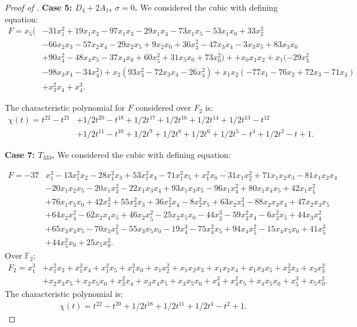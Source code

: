 \documentclass[12pt]{amsart}
\numberwithin{equation}{section}
\theoremstyle{plain}
\theoremstyle{remark}
\theoremstyle{definition}
\newcommand{\bF}{\mathbb{F}}
\begin{document}
\begin{proof}[Proof of ]
\noindent\textbf{Case 5: $D_4+2A_1$, $\sigma=0$.} We considered the cubic with defining equation:
\begin{equation}\label{ex: D4+2A1 no defect}
\begin{split}
    F= x_5(&-31x_1^2+ 19x_1x_2- 97x_1x_3- 29x_1x_4 - 73x_1x_5 - 53x_1x_0 + 33x_2^2\\
    &- 66x_2x_3- 57x_2x_4 - 29x_2x_5 + 9x_2x_0+ 36x_3^2 - 47x_3x_4 - 3x_3x_5 + 83x_3x_0\\
    &+ 90x_4^2 - 48x_4x_5 - 37x_4x_0 + 60x_5^2 + 31x_5x_0 + 73x_0^2)+ + x_0x_1x_2+x_1(- 29x_3^2 \\
    &- 98x_3x_4  - 34x_4^2)+x_2(93x_3^2 - 72x_3x_4  - 26x_4^2)+x_1x_2(-77x_1  - 76x_2+ 72x_3 - 71x_4)\\
    &+ x_3^2x_4  + x_4^3.
\end{split}
\end{equation}

The characteristic polynomial for $F$ considered over $F_2$ is:
\begin{align*} 
\chi(t) = t^{22} - t^{21} &+ 1/2t^{20} - t^{18} + 1/2t^{17} + 1/2t^{16} + 1/2t^{14} + 1/2t^{13} - t^{12} \\
&+ 1/2t^{11} - t^{10} + 1/2t^9 + 1/2t^8 + 1/2t^6 + 1/2t^5 - t^4 + 1/2t^2 - t + 1.
\end{align*}

\noindent\textbf{Case 7: $T_{333}$.} We considered the cubic with defining equation:

\begin{equation}\label{ex: T_333}
\begin{split}
    F= -37&x_1^3 - 13x_1^2x_2 - 28x_1^2x_3 + 53x_1^2x_4 - 71x_1^2x_5 + x_1^2x_0 - 31x_1x_2^2 + 71x_1x_2x_3 - 81x_1x_2x_4 \\
    &- 20x_1x_2x_5 - 20x_1x_3^2 - 22x_1x_3x_4 + 93x_1x_3x_5 - 96x_1x_4^2 + 80x_1x_4x_5 + 42x_1x_5^2 \\
    &+ 76x_1x_5x_0 + 42x_2^3 + 55x_2^2x_3 + 36x_2^2x_4 - 8x_2^2x_5 + 63x_2x_3^2 - 88x_2x_3x_4 + 47x_2x_3x_5 \\
    &+ 64x_2x_4^2 - 62x_2x_4x_5 + 46x_2x_5^2 - 25x_2x_5x_0 - 44x_3^3 - 59x_3^2x_4 - 6x_3^2x_5 + 44x_3x_4^2 \\
    &+ 65x_3x_4x_5 - 70x_3x_5^2 - 55x_3x_5x_0 - 19x_4^3 - 75x_4^2x_5 + 94x_4x_5^2 - 15x_4x_5x_0 + 41x_5^3 \\
    &+ 44x_5^2x_0 + 25x_5x_0^2.
\end{split}
\end{equation}
Over $\bF_2:$
\begin{align*}
    F_2= x_1^3& + x_1^2x_2 + x_1^2x_4 + x_1^2x_5 + x_1^2x_0 + x_1x_2^2 + x_1x_2x_3 + x_1x_2x_4 + x_1x_3x_5 + x_2^2x_3 + x_2x_3^2 \\
    &+ x_2x_3x_5 + x_2x_5x_0 + x_3^2x_4 + x_3x_4x_5 + x_3x_5x_0 + x_4^3 + x_4^2x_5 + x_4x_5x_0 + x_5^3 + x_5x_0^2.
\end{align*}
The characteristic polynomial is:
\begin{align*}
    \chi(t)= t^{22} - t^{20} + 1/2t^{18} + 1/2t^{11} + 1/2t^4 - t^2 + 1.
\end{align*}
\end{proof}






\end{document}
